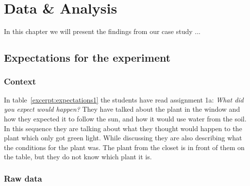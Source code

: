 \chapter{Data \& Analysis}
In this chapter we will present the findings from our case study ...

\section{Expectations for the experiment}

\subsection{Context}
In table~\ref{excerpt:expectations1} the students have read assignment 1a: \emph{What did you expect would happen?} They have talked about the plant in the window and how they expected it to follow the sun, and how it would use water from the soil. In this sequence they are talking about what they thought would happen to the plant which only got green light. While discussing they are also describing what the conditions for the plant was. The plant from the closet is in front of them on the table, but they do not know which plant it is. 
\subsection{Raw data}


